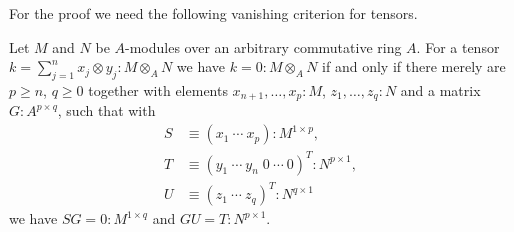 For the proof we need the following vanishing criterion for tensors.

\begin{remark}
  \label{null-tensor-criterion}
  Let $M$ and $N$ be $A$-modules over an arbitrary commutative ring $A$.
  For a tensor $k = \sum_{j=1}^n x_j \otimes y_j : M \otimes_A N$ we have $k = 0 : M \otimes_A N$ if and only if there merely are $p \geq n$, $q \geq 0$ together with elements $x_{n+1},\hdots,x_p : M$, $z_1,\hdots,z_q : N$ and a matrix $G : A^{p \times q}$, such that with
  \begin{align*}
    S &\equiv (x_1 \ \cdots \ x_p) : M^{1 \times p}, \\
    T &\equiv (y_1 \ \cdots \ y_n \; 0 \ \cdots \ 0)^T : N^{p \times 1}, \\
    U &\equiv (z_1 \ \cdots \ z_q)^T : N^{q \times 1}
  \end{align*}
  we have $SG = 0 : M^{1 \times q}$ and $GU = T : N^{p \times 1}$.
\end{remark}

